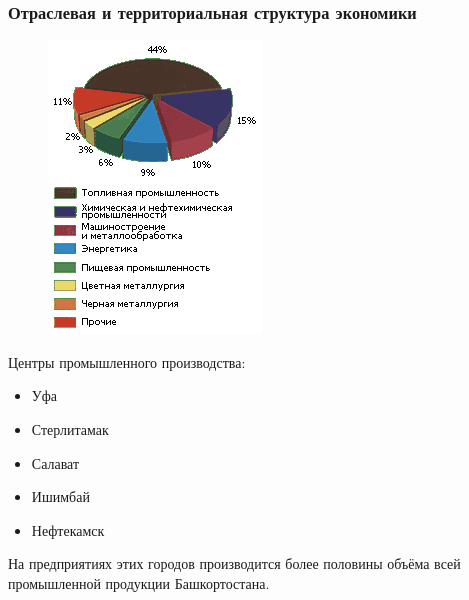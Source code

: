 \begin{frame}
\frametitle{Отраслевая и территориальная структура экономики}

\begin{figure}
\includegraphics[width=1\linewidth]{pics/sasha/promstruct}
\end{figure}
Центры промышленного производства: \\[10pt]
\begin{itemize}
\item Уфа \\[10pt] 
\item Стерлитамак \\[10pt]
\item Салават \\[10pt]
\item Ишимбай \\[10pt]
\item Нефтекамск 
\end{itemize}
\vfill
На предприятиях этих городов производится более половины объёма всей промышленной продукции Башкортостана.

\end{frame}

